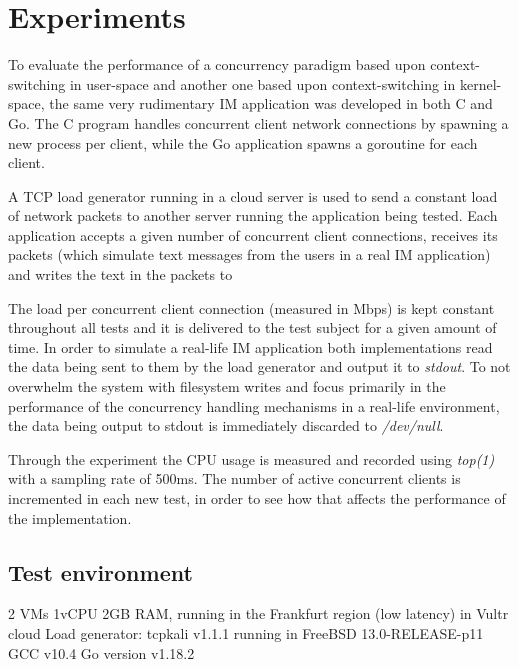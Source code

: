 \section{Experiments}
To evaluate the performance of a concurrency paradigm based upon context-switching in user-space and another one based upon context-switching in kernel-space, the same very rudimentary IM application was developed in both C and Go. The C program handles concurrent client network connections by spawning a new process per client, while the Go application spawns a goroutine for each client. 

A TCP load generator running in a cloud server is used to send a constant load of network packets to another server running the application being tested. Each application accepts a given number of concurrent client connections, receives its packets (which simulate text messages from the users in a real IM application) and writes the text in the packets to 

The load per concurrent client connection (measured in Mbps) is kept constant throughout all tests and it is delivered to the test subject for a given amount of time. In order to simulate a real-life IM application both implementations read the data being sent to them by the load generator and output it to \textit{stdout}. To not overwhelm the system with filesystem writes and focus primarily in the performance of the concurrency handling mechanisms in a real-life environment, the data being output to stdout is immediately discarded to \textit{/dev/null}. 

Through the experiment the CPU usage is measured and recorded using \textit{top(1)} with a sampling rate of 500ms. The number of active concurrent clients is incremented in each new test, in order to see how that affects the performance of the implementation.

\subsection{Test environment}
2 VMs 1vCPU 2GB RAM, running in the Frankfurt region (low latency) in Vultr cloud
Load generator: tcpkali v1.1.1 running in FreeBSD 13.0-RELEASE-p11
GCC v10.4
Go version v1.18.2